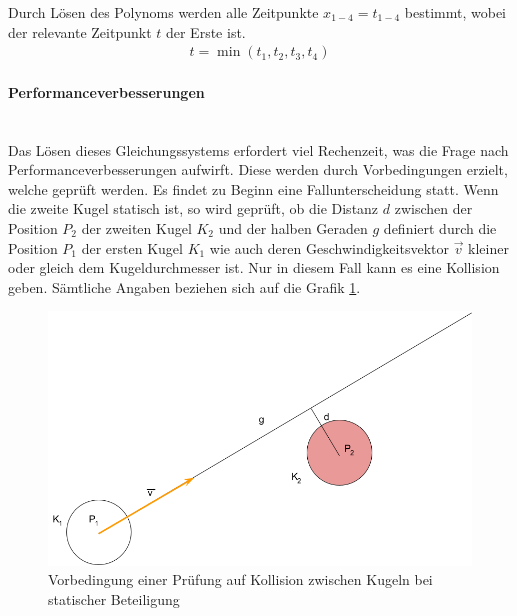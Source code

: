 Durch Lösen des Polynoms werden alle Zeitpunkte $x_{1-4} = t_{1-4}$ bestimmt, wobei der relevante Zeitpunkt $t$ der
Erste ist.
\begin{align}
    t = \min{(t_1, t_2, t_3, t_4)}
\end{align}

\paragraph{Performanceverbesserungen}\label{kap:kugelkollision:performanceverbesserung} \hfill \\
Das Lösen dieses Gleichungssystems erfordert viel Rechenzeit, was die Frage nach Performanceverbesserungen aufwirft.
Diese werden durch Vorbedingungen erzielt, welche geprüft werden. Es findet zu Beginn eine Fallunterscheidung
statt. Wenn die zweite Kugel statisch ist, so wird geprüft, ob die Distanz $d$ zwischen der Position $P_2$ der zweiten Kugel
$K_2$ und der halben Geraden $g$ definiert durch die Position $P_1$ der ersten Kugel $K_1$ wie auch deren Geschwindigkeitsvektor
$\vec{v}$ kleiner oder gleich dem Kugeldurchmesser ist. Nur in diesem Fall kann es eine Kollision geben.
Sämtliche Angaben beziehen sich auf die Grafik \ref{fig:kugelkollision_vorbedingung_statisch}.

\begin{figure}[h!]
    \begin{center}
        \includegraphics[width=0.4\linewidth]{../common/03_billiard_ai/resources/24_vorbedingung_kugelkollision_statisch.png}
    \end{center}
    \caption{Vorbedingung einer Prüfung auf Kollision zwischen Kugeln bei statischer Beteiligung}
    \label{fig:kugelkollision_vorbedingung_statisch}
\end{figure}

